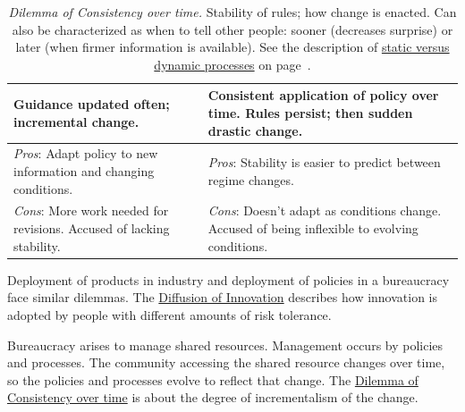 \begin{center}
\begin{table}[H] %
\begin{tabular}{ | m{\dilemmatablewidth}| m{\dilemmatablewidth} | } 
  \hline
  \textbf{Guidance updated often; incremental change.} & 
  \textbf{Consistent application of policy over time. Rules persist; then sudden drastic change.} \\ 
  \hline
  \textit{Pros}: Adapt policy to new information and changing conditions. &
  \textit{Pros}: Stability is easier to predict between regime changes.  \\
  \hline
  \textit{Cons}: More work needed for revisions. Accused of lacking stability. & 
  \textit{Cons}: Doesn't adapt as conditions change. Accused of being inflexible to evolving conditions. \\
  \hline
\end{tabular}
\caption{
\textit{Dilemma of Consistency over time.} 
Stability of rules; how change is enacted. Can also be characterized as when to tell other people: sooner (decreases surprise) or later (when firmer information is available).
See the description of 
\hyperref[sec:static-dynamic-processes]{static versus dynamic processes} on page~\pageref{sec:static-dynamic-processes}.
}
\label{table:consistency}
\end{table}
\end{center}

Deployment of products in industry and deployment of policies in a bureaucracy face similar dilemmas. The \href{https://en.wikipedia.org/wiki/Diffusion_of_innovations}{Diffusion of Innovation} 
describes how innovation is adopted by people with different amounts of risk tolerance.

Bureaucracy arises to manage shared resources. Management occurs by policies and processes. The community accessing the shared resource changes over time, so the policies and processes evolve to reflect that change. The \hyperref[table:consistency]{Dilemma of Consistency over time} is about the degree of incrementalism of the change.

